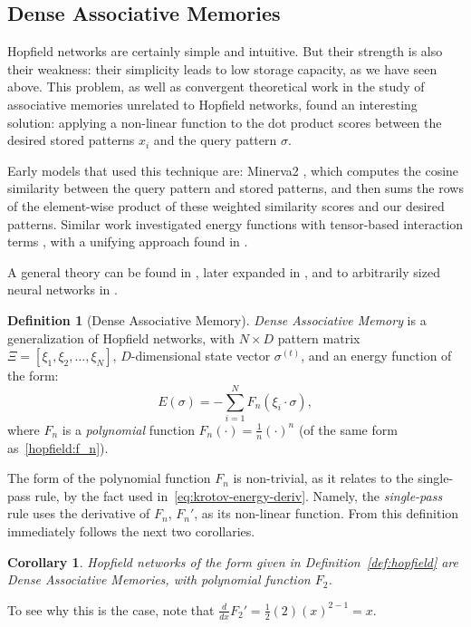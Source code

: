 \documentclass{article}
\newtheorem{corollary}{Corollary}[subsection]
\theoremstyle{definition}
\newtheorem{definition}{Definition}[subsection]
\begin{document}
\subsection{Dense Associative Memories}\label{sec:dam}

Hopfield networks are certainly simple and intuitive. But their strength
is also their weakness: their simplicity leads to low storage capacity,
as we have seen above. This problem, as well as convergent theoretical
work in the study of associative memories unrelated to Hopfield networks,
found an interesting solution: applying a non-linear function to the
dot product scores between the desired stored patterns $x_i$ and the
query pattern $\sigma$.

Early models that used this technique are: \textsf{Minerva2}
\parencite{hintzman_minerva_1984},
which computes the cosine similarity between the query pattern
and stored patterns, and then sums the rows of the element-wise
product of these weighted similarity scores and our desired patterns.
Similar work investigated energy functions with tensor-based
interaction terms \parencites{psaltis_higher_1988,chen_high_1986},
with a unifying approach found in \textcite{kelly_memory_2017}.

A general theory can be found in \textcite{krotov_dense_2016},
later expanded in \textcites{demircigil_model_2017},
and to arbitrarily sized neural networks in \textcite{krotov_hierarchical_2021}.
\begin{definition}[Dense Associative Memory]
  \textit{Dense Associative Memory} is a generalization of Hopfield networks,
  with $N \times D$ pattern matrix $\Xi = [\xi_1, \xi_2, \dots, \xi_N]$,
  $D$-dimensional state vector $\sigma^{(t)}$, and an energy function
  of the form:
  \begin{equation}
    E(\sigma) = - \sum^N_{i=1} F_n \left( \xi_i \cdot \sigma \right),
  \end{equation}
  where $F_n$ is a \textit{polynomial} function $F_n(\cdot) =
  \frac{1}{n}(\cdot)^{n}$ (of the same form
  as~\autoref{hopfield:f_n}).
\end{definition}

The form of the polynomial function $F_n$ is non-trivial, as it relates
to the single-pass rule, by the fact used in~\autoref{eq:krotov-energy-deriv}.
Namely, the \textit{single-pass} rule uses the derivative of $F_n$, $F_n'$,
as its non-linear function. From this definition immediately
follows the next two corollaries.

\begin{corollary}
  Hopfield networks of the form given in Definition~\ref{def:hopfield}
  are Dense Associative Memories, with polynomial function $F_2$.
\end{corollary}
\noindent
To see why this is the case, note that $\frac{d}{dx} F_2' =
\frac{1}{2}(2) (x)^{2-1} = x$.
\end{document}
